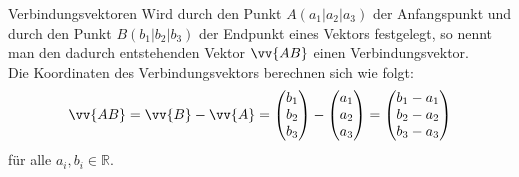 \begin{satz}{Verbindungsvektoren}{}
Wird durch den Punkt $A(a_1|a_2|a_3)$ der Anfangspunkt und durch den Punkt $B(b_1|b_2|b_3)$ der Endpunkt eines Vektors festgelegt, so nennt man den dadurch entstehenden Vektor $\vv{AB}$ einen Verbindungsvektor. \\
Die Koordinaten des Verbindungsvektors berechnen sich wie folgt: $$\vv{AB} = \vv{B} -\vv{A} = \begin{pmatrix} b_1 \\ b_2 \\b_3 \end{pmatrix} - \begin{pmatrix} a_1 \\ a_2 \\a_3 \end{pmatrix} = \begin{pmatrix} b_1 - a_1 \\b_2 - a_2 \\b_3 -a_3 \end{pmatrix}$$
für alle $a_i, b_i \in \mathds{R}$.
\end{satz}
